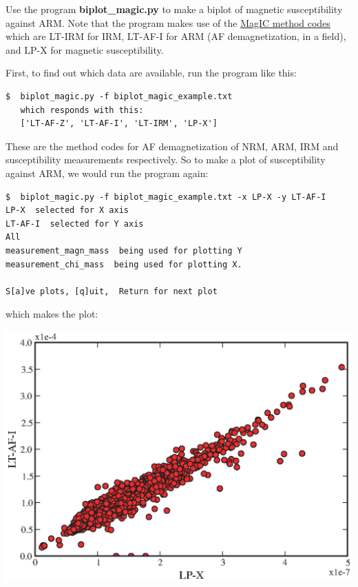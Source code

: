 \documentclass[11pt]{book}
\begin{document}
{{Use the program {\bf biplot\_magic.py} to make a biplot of  magnetic susceptibility against ARM.  Note that the program makes use of the \href{#method_codes}{MagIC method codes} which are LT-IRM for IRM, LT-AF-I for ARM (AF demagnetization, in a field), and LP-X for magnetic susceptibility.

First, to find out which data are available, run the program like this:

\begin{verbatim}
$  biplot_magic.py -f biplot_magic_example.txt
   which responds with this:
   ['LT-AF-Z', 'LT-AF-I', 'LT-IRM', 'LP-X']
   \end{verbatim}

These are the method codes for  AF demagnetization of NRM, ARM, IRM and susceptibility measurements respectively.  So to make a plot of
susceptibility against ARM, we would run the program again:


\begin{verbatim}
$  biplot_magic.py -f biplot_magic_example.txt -x LP-X -y LT-AF-I
LP-X  selected for X axis
LT-AF-I  selected for Y axis
All
measurement_magn_mass  being used for plotting Y
measurement_chi_mass  being used for plotting X.

S[a]ve plots, [q]uit,  Return for next plot
\end{verbatim}

\noindent which makes the plot:

  \includegraphics[width=15cm]{EPSfiles/arm-x.eps}



}}
\end{document}
